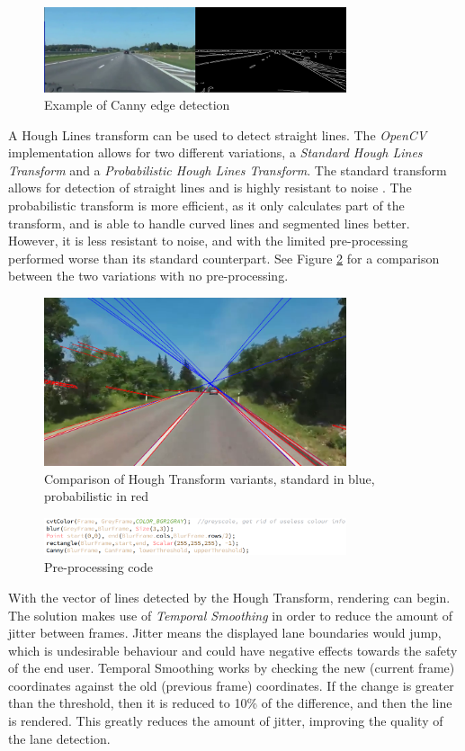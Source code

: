 \documentclass[conference]{IEEEtran}
\begin{document}
\begin{figure}[H]
\centering
\includegraphics[width=3.5in]{t5_edge}
\caption{Example of Canny edge detection}
\label{fig:Canny}
\end{figure}
 

A Hough Lines transform can be used to detect straight lines. The \textit{OpenCV} implementation allows for two different variations, a \textit{Standard Hough Lines Transform} and a \textit{Probabilistic Hough Lines Transform}. The standard transform allows for detection of straight lines and is highly resistant to noise \cite{4608701}. The probabilistic transform is more efficient, as it only calculates part of the transform, and is able to handle curved lines and segmented lines better. However, it is less resistant to noise, and with the limited pre-processing performed worse than its standard counterpart. See Figure \ref{fig:houghComp} for a comparison between the two variations with no pre-processing. 
\begin{figure}[H]
\centering
\includegraphics[width=3.5in]{t5_houghcomp}
\caption{Comparison of Hough Transform variants, standard in blue, probabilistic in red}
\label{fig:houghComp}
\end{figure}
\begin{figure}[H]
\centering
\includegraphics[width=3.5in]{t5_proc}
\caption{Pre-processing code}
\label{fig:t5proc}
\end{figure}
With the vector of lines detected by the Hough Transform, rendering can begin. The solution makes use of \textit{Temporal Smoothing}\cite{TemporalSmoothing} in order to reduce the amount of jitter between frames. Jitter means the displayed lane boundaries would jump, which is undesirable behaviour and could have negative effects towards the safety of the end user. Temporal Smoothing works by checking the new (current frame) coordinates against the old (previous frame) coordinates. If the change is greater than the threshold, then it is reduced to 10\% of the difference, and then the line is rendered. This greatly reduces the amount of jitter, improving the quality of the lane detection. 
\end{document}
